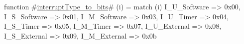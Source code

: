 function #\hyperref[sailRISCVzinterruptTypezytozybits]{interruptType\_to\_bits}# (i) =
  match (i) {
    I_U_Software => 0x00,
    I_S_Software => 0x01,
    I_M_Software => 0x03,
    I_U_Timer    => 0x04,
    I_S_Timer    => 0x05,
    I_M_Timer    => 0x07,
    I_U_External => 0x08,
    I_S_External => 0x09,
    I_M_External => 0x0b
  }
